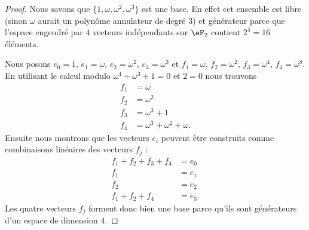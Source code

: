\begin{proof}
	Nous savons que \( \{ 1,\omega,\omega^2,\omega^3 \}\) est une base. En effet cet ensemble est libre (sinon \( \omega\) aurait un polynôme annulateur de degré \( 3\)) et générateur parce que l'espace engendré par \( 4\) vecteurs indépendants sur \( \eF_2\) contient \( 2^4=16\) éléments.

	Nous posons \( e_0=1\), \( e_1=\omega\), \( e_2=\omega^2\), \( e_3=\omega^3\) et \( f_1=\omega\), \( f_2=\omega^2\), \( f_3=\omega^4\), \( f_4=\omega^8\). En utilisant le calcul modulo \( \omega^4+\omega^3+1=0\) et \( 2=0\) nous trouvons
	\begin{subequations}
		\begin{align}
			f_1 & =\omega                    \\
			f_2 & =\omega^2                  \\
			f_3 & =\omega^3+1                \\
			f_4 & =\omega^3+\omega^2+\omega.
		\end{align}
	\end{subequations}
	Ensuite nous montrons que les vecteurs \( e_i\) peuvent être construits comme combinaisons linéaires des vecteurs \( f_j\) :
	\begin{subequations}
		\begin{align}
			f_1+f_2+f_3+f_4 & =e_0  \\
			f_1             & =e_1  \\
			f_2             & =e_2  \\
			f_1+f_2+f_4     & =e_3.
		\end{align}
	\end{subequations}
	Les quatre vecteurs \( f_j\) forment donc bien une base parce qu'ils sont générateurs d'un espace de dimension \( 4\).
\end{proof}

